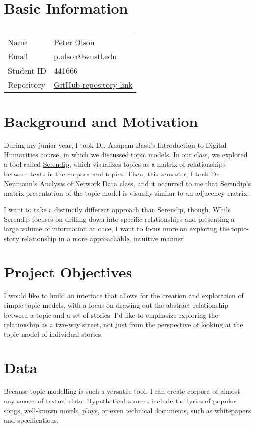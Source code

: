



\section{Basic Information}
$\ $

\begin{tabular}{ll}
	Name & Peter Olson \\
	Email & p.olson@wustl.edu \\
	Student ID & 441666 \\
	Repository & \href{https://github.com/BackToTheDrawingBoard/cse557-fl18-information-visualization-final-project}{GitHub repository link}
\end{tabular}


\section{Background and Motivation}
During my junior year, I took Dr. Anupam Basu's Introduction to Digital
Humanities course, in which we discussed topic models.  In our class, we
explored a tool called
\href{http://vep.cs.wisc.edu/serendip/}{Serendip}, which visualizes
topics as a matrix of relationships between texts in the corpora and
topics.  Then, this semester, I took Dr. Neumann's Analysis of Network
Data class, and it occurred to me that Serendip's matrix presentation of
the topic model is visually similar to an adjacency matrix.

I want to take a distinctly different approach than Serendip, though.
While Serendip focuses on drilling down into specific relationships and
presenting a large volume of information at once, I want to focus more
on exploring the topic-story relationship in a more approachable,
intuitive manner.

\section{Project Objectives}
I would like to build an interface that allows for the creation and
exploration of simple topic models, with a focus on drawing out the
abstract relationship between a topic and a set of stories.  I'd like to
emphasize exploring the relationship as a two-way street, not just from
the perspective of looking at the topic model of individual stories.

\section{Data}
Because topic modelling is such a versatile tool, I can create corpora
of almost any source of textual data.  Hypothetical sources include the
lyrics of popular songs, well-known novels, plays, or even technical
documents, such as whitepapers and specifications.

